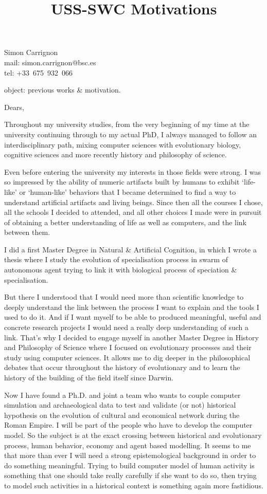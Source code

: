 \documentclass[a4paper]{lettre}
\title{USS-SWC Motivations}
\begin{document}
Simon Carrignon
\\mail: simon.carrignon@bsc.es
\\tel: +33~675~932~066


\vfill

object: previous works \& motivation.

\vspace{1.5cm}
	Dears,



Throughout my university studies, from the very beginning of my time at the university continuing through to my actual PhD, I always managed to follow an interdisciplinary path, mixing computer sciences with evolutionary biology, cognitive sciences and more recently history and philosophy of science.

Even before entering the university my interests in those fields were strong.  I was so impressed by the ability of numeric artifacts built by humans to exhibit ‘life-like’ or ‘human-like’ behaviors that I became determined to find a way to understand artificial artifacts and living beings. Since then all the courses I chose, all the schools I decided to attended, and all other choices I made were in pursuit of obtaining a better understanding of life as well as computers, and the link between them. 

I did a first Master Degree in Natural \& Artificial Cognition, in which I wrote a thesis where I study the evolution of specialisation process in swarm of autonomous agent trying to link it with biological process of speciation \& specialisation.

But there I understood that I would need more than scientific knowledge to deeply understand the link between the process I want to explain and the tools I used to do it. And if I want myself to be able to produced meaningful, useful and concrete research projects I would need a really deep understanding of such a link. That's why I decided to engage myself in another Master Degree in History and Philosophy of Science where I focused on evolutionary processes and their study using computer sciences. It allows me to dig deeper in the philosophical debates that occur throughout the history of evolutionary and to learn the history of the building of the field itself since Darwin.

Now I have found a Ph.D. and joint a team who wants to couple computer simulation and archaeological data to test and validate (or not) historical hypothesis on the evolution of cultural and economical network during the Roman Empire. I will be part of the people who have to develop the computer model. So the subject is at the exact crossing between historical and evolutionary process, human behavior, economy and agent based modelling. It seems to me that more than ever I will need a strong epistemological background in order to do something meaningful. Trying to build computer model of human activity is something that one should take really carefully if she want to do so, then trying to model such activities in a historical context is something again more fastidious.
\end{document}
